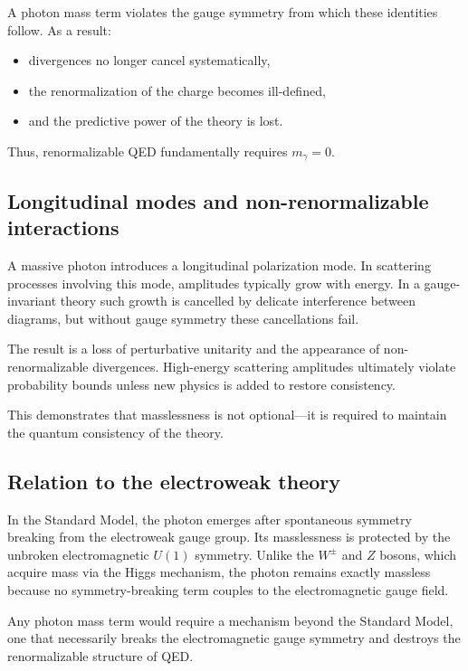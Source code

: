 A photon mass term violates the gauge symmetry from which these identities 
follow. As a result:

\begin{itemize}
	\item divergences no longer cancel systematically,
	\item the renormalization of the charge becomes ill-defined,
	\item and the predictive power of the theory is lost.
\end{itemize}

Thus, renormalizable QED fundamentally requires $m_\gamma = 0$.

\subsection*{Longitudinal modes and non-renormalizable interactions}

A massive photon introduces a longitudinal polarization mode. In scattering 
processes involving this mode, amplitudes typically grow with energy.  
In a gauge-invariant theory such growth is cancelled by delicate 
interference between diagrams, but without gauge symmetry these 
cancellations fail.

The result is a loss of perturbative unitarity and the appearance of 
non-renormalizable divergences. High-energy scattering amplitudes 
ultimately violate probability bounds unless new physics is added to 
restore consistency.

This demonstrates that masslessness is not optional—it is required to 
maintain the quantum consistency of the theory.

\subsection*{Relation to the electroweak theory}

In the Standard Model, the photon emerges after spontaneous symmetry 
breaking from the electroweak gauge group. Its masslessness is protected 
by the unbroken electromagnetic $U(1)$ symmetry. Unlike the $W^\pm$ and 
$Z$ bosons, which acquire mass via the Higgs mechanism, the photon remains 
exactly massless because no symmetry-breaking term couples to the 
electromagnetic gauge field.

Any photon mass term would require a mechanism beyond the Standard Model, 
one that necessarily breaks the electromagnetic gauge symmetry and destroys 
the renormalizable structure of QED.

